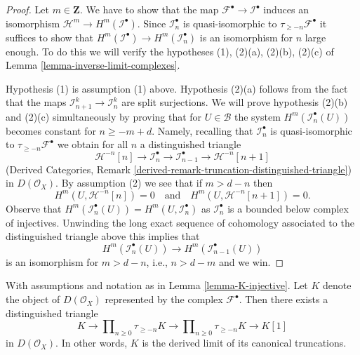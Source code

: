 \begin{proof}
Let $m \in \mathbf{Z}$.
We have to show that the map $\mathcal{F}^\bullet \to \mathcal{I}^\bullet$
induces an isomorphism $\mathcal{H}^m \to H^m(\mathcal{I}^\bullet)$.
Since $\mathcal{I}_n^\bullet$ is quasi-isomorphic to
$\tau_{\geq -n}\mathcal{F}^\bullet$ it suffices to show that
$H^m(\mathcal{I}^\bullet) \to H^m(\mathcal{I}_n^\bullet)$
is an isomorphism for $n$ large enough. To do this we will verify the
hypotheses (1), (2)(a), (2)(b), (2)(c) of
Lemma \ref{lemma-inverse-limit-complexes}.

\medskip\noindent
Hypothesis (1) is assumption (1) above. Hypothesis (2)(a) follows
from the fact that the maps $\mathcal{I}_{n + 1}^k \to \mathcal{I}_n^k$
are split surjections. We will prove hypothesis (2)(b) and (2)(c)
simultaneously by proving that for $U \in \mathcal{B}$ the system
$H^m(\mathcal{I}_n^\bullet(U))$ becomes constant for $n \geq -m + d$.
Namely, recalling that $\mathcal{I}_n^\bullet$ is quasi-isomorphic
to $\tau_{\geq -n}\mathcal{F}^\bullet$ we obtain for all $n$
a distinguished triangle
$$
\mathcal{H}^{-n}[n] \to \mathcal{I}_n^\bullet \to
\mathcal{I}_{n - 1}^\bullet \to \mathcal{H}^{-n}[n + 1]
$$
(Derived Categories, Remark
\ref{derived-remark-truncation-distinguished-triangle})
in $D(\mathcal{O}_X)$. By assumption (2) we see that if $m > d - n$ then
$$
H^m(U, \mathcal{H}^{-n}[n]) = 0
\quad\text{and}\quad
H^m(U, \mathcal{H}^{-n}[n + 1]) = 0.
$$
Observe that $H^m(\mathcal{I}_n^\bullet(U)) = H^m(U, \mathcal{I}_n^\bullet)$
as $\mathcal{I}_n^\bullet$ is a bounded below complex of injectives.
Unwinding the long exact sequence of cohomology associated to the distinguished
triangle above this implies that
$$
H^m(\mathcal{I}_n^\bullet(U)) \to H^m(\mathcal{I}_{n - 1}^\bullet(U))
$$
is an isomorphism for $m > d - n$, i.e., $n > d - m$ and we win.
\end{proof}

\begin{lemma}
\label{lemma-is-limit}
With assumptions and notation as in Lemma \ref{lemma-K-injective}.
Let $K$ denote the object of $D(\mathcal{O}_X)$ represented by
the complex $\mathcal{F}^\bullet$.
Then there exists a distinguished triangle
$$
K \to
\prod\nolimits_{n \geq 0} \tau_{\geq -n} K \to
\prod\nolimits_{n \geq 0} \tau_{\geq -n} K \to K[1]
$$
in $D(\mathcal{O}_X)$. In other words, $K$ is the derived
limit of its canonical truncations.
\end{lemma}

